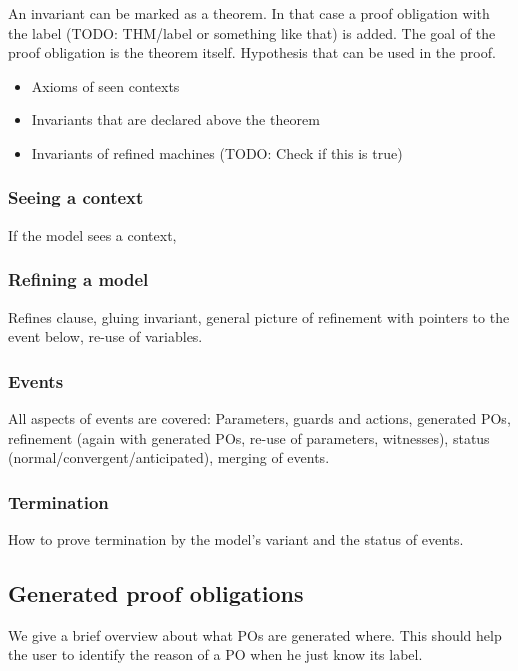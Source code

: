 An invariant can be marked as a theorem. In that case a proof obligation with the label (TODO: THM/label or something like that) is added.
The goal of the proof obligation is the theorem itself.
Hypothesis that can be used in the proof.
\begin{itemize}
\item Axioms of seen contexts
\item Invariants that are declared above the theorem
\item Invariants of refined machines (TODO: Check if this is true)
\end{itemize}

\subsubsection{Seeing a context}
If the model sees a context, 

\subsubsection{Refining a model}

Refines clause, gluing invariant, general picture of refinement with pointers to the event below, re-use of variables.

\subsubsection{Events}

All aspects of events are covered: Parameters, guards and actions, generated POs, refinement (again with generated POs, re-use of parameters, witnesses), status (normal/convergent/anticipated), merging of events.

\subsubsection{Termination}

How to prove termination by the model's variant and the status of events.
  
\subsection{Generated proof obligations}

We give a brief overview about what POs are generated where. This should help the user to identify the reason of a PO when he just know its label.


